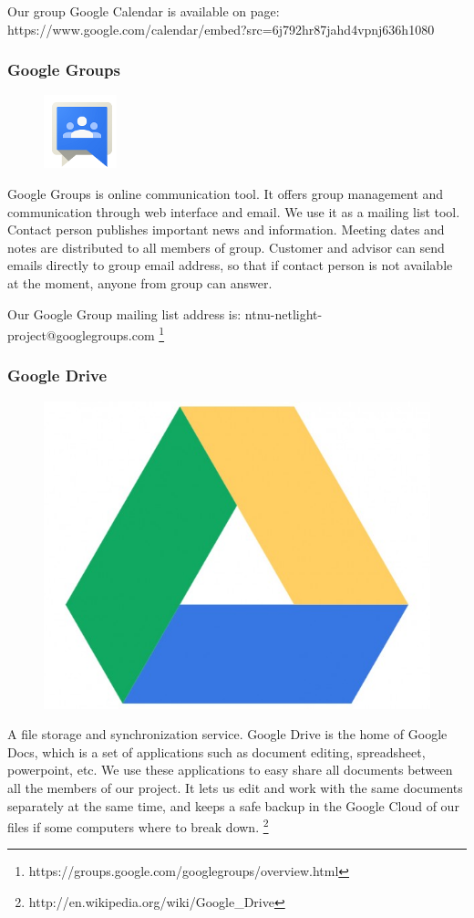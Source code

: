 Our group Google Calendar is available on page:
https://www.google.com/calendar/embed?src=6j792hr87jahd4vpnj636h1080%

\subsubsection{Google Groups}

\begin{figure}
\vspace{-30pt}
\centering
\includegraphics[width = .20\textwidth]{image/groups-logo.png}
\end{figure}

Google Groups is online communication tool. It offers group management and communication through web interface and email. We use it as a mailing list tool. Contact person publishes important news and information. Meeting dates and notes are distributed to all members of group. Customer and advisor can send emails directly to group email address, so that if contact person is not available at the moment, anyone from group can answer.

Our Google Group mailing list address is: ntnu-netlight-project@googlegroups.com
\footnote{https://groups.google.com/googlegroups/overview.html}

\subsubsection{Google Drive}

\begin{figure}
\vspace{-30pt}
\centering
\includegraphics[width = .20\textwidth]{image/drive-logo.jpg}
\end{figure}

A file storage and synchronization service. Google Drive is the home of Google Docs, which is a set of applications such as document editing, spreadsheet, powerpoint, etc. We use these applications to easy share all documents between all the members of our project. It lets us edit and work with the same documents separately at the same time, and keeps a safe backup in the Google Cloud of our files if some computers where to break down.
\footnote{http://en.wikipedia.org/wiki/Google\_Drive}


